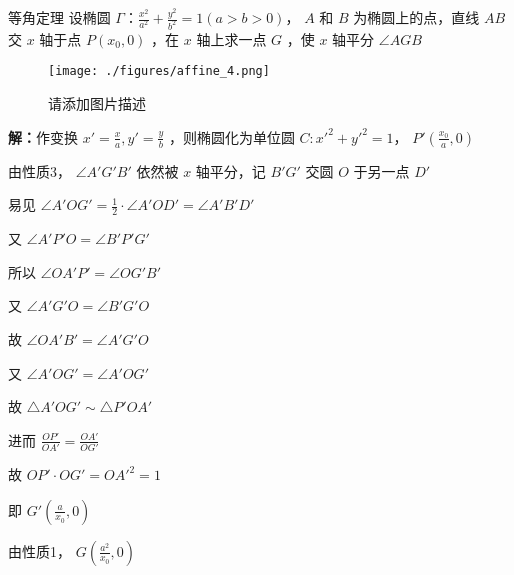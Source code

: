 \begin{corollary}{等角定理}
设椭圆 \(\Gamma：\frac{x^2}{a^2}+\frac{y^2}{b^2}=1(a>b>0)\)， \(A\) 和 \(B\) 为椭圆上的点，直线 \(AB\) 交 \(x\) 轴于点 \(P(x_0,0)\) ，在 \(x\) 轴上求一点 \(G\) ，使 \(x\) 轴平分 \(\angle AGB\) 

\begin{figure}[ht]
\centering
\texttt{[image: ./figures/affine\_4.png]}
\caption{请添加图片描述} \label{affine_fig4}
\end{figure}
\textbf{解：}作变换 \(x'=\frac{x}{a},y'=\frac{y}{b}\) ，则椭圆化为单位圆 \(C:x'^2+y'^2=1\)， \(P'\left(\frac{x_0}{a},0 \right)\) 

由性质3， \(\angle A'G'B'\) 依然被 \(x\) 轴平分，记 \(B'G'\) 交圆 \(O\) 于另一点 \(D'\)

易见 \(\angle A'OG'=\frac{1}{2}\cdot\angle A'OD'=\angle A'B'D'\) 

又 \(\angle A'P'O=\angle B'P'G'\)

所以 \(\angle OA'P'=\angle OG'B'\)

又 \(\angle A'G'O=\angle B'G'O\)

故 \(\angle OA'B'=\angle A'G'O\)

又 \(\angle A'OG'=\angle A'OG'\)

故 \(\triangle A'OG'\sim \triangle P'OA'\)

进而 \(\frac{OP'}{OA'}=\frac{OA'}{OG'}\)

故 \(OP'\cdot OG'=OA'^2=1\) 

即 \(G'\left(\frac{a}{x_0},0\right)\)

由性质1， \(G\left( \frac{a^2}{x_0},0\right)\) 

\end{corollary}

